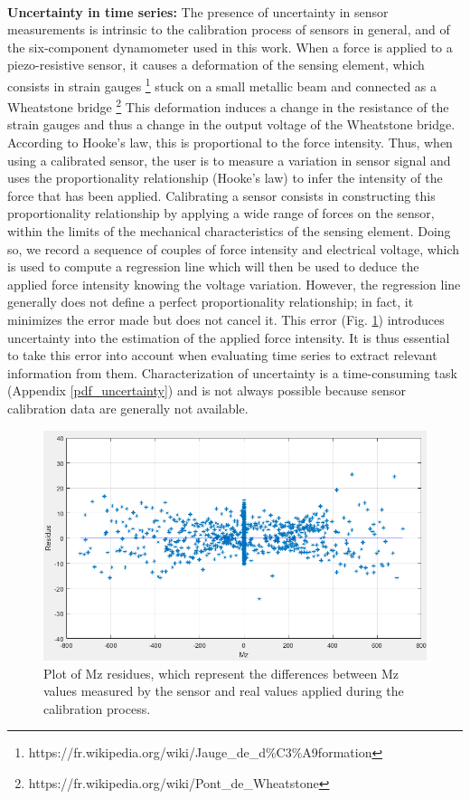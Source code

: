 \paragraph{}\textbf{Uncertainty in time series:} The presence of uncertainty in sensor measurements is intrinsic to the calibration process of sensors in general, and of the six-component dynamometer used in this work. When a force is applied to a piezo-resistive sensor, it causes a deformation of the sensing element, which consists in strain gauges \footnote{https://fr.wikipedia.org/wiki/Jauge\_de\_d\%C3\%A9formation} stuck on a small metallic beam and connected as a Wheatstone bridge \footnote{https://fr.wikipedia.org/wiki/Pont\_de\_Wheatstone} This deformation induces a change in the resistance of the strain gauges and thus a change in the output voltage of the Wheatstone bridge. According to Hooke's law, this is proportional to the force intensity. Thus, when using a calibrated sensor, the user is to measure a variation in sensor signal and uses the proportionality relationship (Hooke's law) to infer the intensity of the force that has been applied. Calibrating a sensor consists in constructing this proportionality relationship by applying a wide range of forces on the sensor, within the limits of the mechanical characteristics of the sensing element. Doing so, we record a sequence of couples of force intensity and electrical voltage, which is used to compute a regression line which will then be used to deduce the applied force intensity knowing the voltage variation. However, the regression line generally does not define a perfect proportionality relationship; in fact, it minimizes the error made but does not cancel it. This error (Fig. \ref{residus}) introduces uncertainty into the estimation of the applied force intensity. It is thus essential to take this error into account when evaluating time series to extract relevant information from them. Characterization of uncertainty is a time-consuming task (Appendix \ref{pdf_uncertainty}) and is not always possible because sensor calibration data are generally not available. 

\begin{figure}[h]
\center
\includegraphics[scale = 0.5]{images/residus}
\caption{Plot of Mz residues, which represent the differences between
Mz values measured by the sensor and real values applied during the calibration process.}
\label{residus}
\end{figure}

